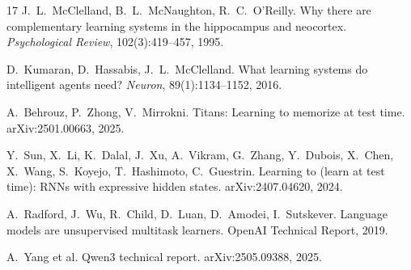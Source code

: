 \documentclass[11pt]{article}
\begin{document}
\begin{thebibliography}{17}
 J.~L.~McClelland, B.~L.~McNaughton, R.~C.~O'Reilly. Why there are complementary learning systems in the hippocampus and neocortex. \emph{Psychological Review}, 102(3):419--457, 1995.

 D.~Kumaran, D.~Hassabis, J.~L.~McClelland. What learning systems do intelligent agents need? \emph{Neuron}, 89(1):1134--1152, 2016.

 A.~Behrouz, P.~Zhong, V.~Mirrokni. Titans: Learning to memorize at test time. arXiv:2501.00663, 2025.

 Y.~Sun, X.~Li, K.~Dalal, J.~Xu, A.~Vikram, G.~Zhang, Y.~Dubois, X.~Chen, X.~Wang, S.~Koyejo, T.~Hashimoto, C.~Guestrin. Learning to (learn at test time): RNNs with expressive hidden states. arXiv:2407.04620, 2024.

 A.~Radford, J.~Wu, R.~Child, D.~Luan, D.~Amodei, I.~Sutskever. Language models are unsupervised multitask learners. OpenAI Technical Report, 2019.

 A.~Yang et al. Qwen3 technical report. arXiv:2505.09388, 2025.

\end{thebibliography}
\end{document}
